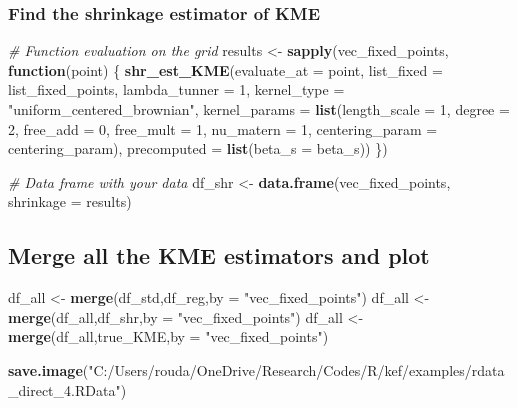 \documentclass[
]{article}
\newenvironment{Shaded}{\begin{snugshade}}{\end{snugshade}}
\newcommand{\AttributeTok}[1]{\textcolor[rgb]{0.13,0.29,0.53}{#1}}
\newcommand{\CommentTok}[1]{\textcolor[rgb]{0.56,0.35,0.01}{\textit{#1}}}
\newcommand{\ControlFlowTok}[1]{\textcolor[rgb]{0.13,0.29,0.53}{\textbf{#1}}}
\newcommand{\DecValTok}[1]{\textcolor[rgb]{0.00,0.00,0.81}{#1}}
\newcommand{\FunctionTok}[1]{\textcolor[rgb]{0.13,0.29,0.53}{\textbf{#1}}}
\newcommand{\NormalTok}[1]{#1}
\newcommand{\OtherTok}[1]{\textcolor[rgb]{0.56,0.35,0.01}{#1}}
\newcommand{\StringTok}[1]{\textcolor[rgb]{0.31,0.60,0.02}{#1}}
\begin{document}
\subsubsection{Find the shrinkage estimator of
KME}\label{find-the-shrinkage-estimator-of-kme-1}

\begin{Shaded}
\begin{Highlighting}[]
\CommentTok{\# Function evaluation on the grid}
\NormalTok{results }\OtherTok{\textless{}{-}} \FunctionTok{sapply}\NormalTok{(vec\_fixed\_points, }\ControlFlowTok{function}\NormalTok{(point) \{}
  \FunctionTok{shr\_est\_KME}\NormalTok{(}\AttributeTok{evaluate\_at =}\NormalTok{ point,}
              \AttributeTok{list\_fixed =}\NormalTok{ list\_fixed\_points,}
              \AttributeTok{lambda\_tunner =} \DecValTok{1}\NormalTok{,}
              \AttributeTok{kernel\_type =} \StringTok{"uniform\_centered\_brownian"}\NormalTok{,}
              \AttributeTok{kernel\_params =} \FunctionTok{list}\NormalTok{(}\AttributeTok{length\_scale =} \DecValTok{1}\NormalTok{, }\AttributeTok{degree =} \DecValTok{2}\NormalTok{, }\AttributeTok{free\_add =} \DecValTok{0}\NormalTok{, }\AttributeTok{free\_mult =} \DecValTok{1}\NormalTok{, }\AttributeTok{nu\_matern =} \DecValTok{1}\NormalTok{, }\AttributeTok{centering\_param =}\NormalTok{ centering\_param),}
              \AttributeTok{precomputed =} \FunctionTok{list}\NormalTok{(}\AttributeTok{beta\_s =}\NormalTok{ beta\_s))}
\NormalTok{\})}


\CommentTok{\# Data frame with your data}
\NormalTok{df\_shr }\OtherTok{\textless{}{-}} \FunctionTok{data.frame}\NormalTok{(vec\_fixed\_points, }\AttributeTok{shrinkage =}\NormalTok{ results)}
\end{Highlighting}
\end{Shaded}

\subsection{Merge all the KME estimators and
plot}\label{merge-all-the-kme-estimators-and-plot}

\begin{Shaded}
\begin{Highlighting}[]
\NormalTok{df\_all }\OtherTok{\textless{}{-}} \FunctionTok{merge}\NormalTok{(df\_std,df\_reg,}\AttributeTok{by =} \StringTok{"vec\_fixed\_points"}\NormalTok{)}
\NormalTok{df\_all }\OtherTok{\textless{}{-}} \FunctionTok{merge}\NormalTok{(df\_all,df\_shr,}\AttributeTok{by =} \StringTok{"vec\_fixed\_points"}\NormalTok{)}
\NormalTok{df\_all }\OtherTok{\textless{}{-}} \FunctionTok{merge}\NormalTok{(df\_all,true\_KME,}\AttributeTok{by =} \StringTok{"vec\_fixed\_points"}\NormalTok{)}

\FunctionTok{save.image}\NormalTok{(}\StringTok{"C:/Users/rouda/OneDrive/Research/Codes/R/kef/examples/rdata\_direct\_4.RData"}\NormalTok{)}
\end{Highlighting}
\end{Shaded}
\end{document}

